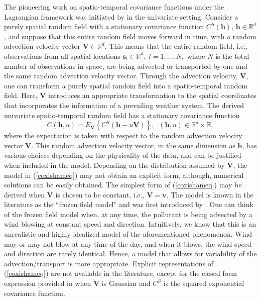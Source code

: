 \documentclass[12pt]{article}
\newcommand{\0}{\mathbf{0}}
\begin{document}
The pioneering work on spatio-temporal covariance functions under the Lagrangian framework was initiated by \citet{cox1988} in the univariate setting. Consider a purely spatial random field with a stationary covariance function $C^S(\mathbf{h})$, $\mathbf{h} \in \mathbb{R}^d$, and suppose that this entire random field moves forward in time, with a random advection velocity vector $\mathbf{V} \in \mathbb{R}^d$. This means that the entire random field, i.e., observations from all spatial locations $\mathbf{s}_l\in \mathbb{R}^d,\; l=1,\ldots,N,$ where $N$ is the total number of observations in space, are being advected or transported by one and the same random advection velocity vector. Through the advection velocity, $\mathbf{V}$, one can transform a purely spatial random field into a spatio-temporal random field. Here, $\mathbf{V}$ introduces an appropriate transformation to the spatial coordinates that incorporates the information of a prevailing weather system. The derived univariate spatio-temporal random field has a stationary covariance function
\begin{equation}\label{coxishameq}
C(\mathbf{h},u)=E_{\mathbf{V}}\left\{C^S(\mathbf{h}-u\mathbf{V})\right\},\;\;(\mathbf{h},u)\in\mathbb{R}^d\times \mathbb{R},
\end{equation}
where the expectation is taken with respect to the random advection velocity vector $\mathbf{V}$. This random advection velocity vector, in the same dimension as $\mathbf{h}$, has various choices depending on the physicality of the data, and can be justified when included in the model. Depending on the distribution assumed by $\mathbf{V}$, the model in (\ref{coxishameq}) may not obtain an explicit form, although, numerical solutions can be easily obtained. The simplest form of (\ref{coxishameq}) may be derived when $\mathbf{V}$ is chosen to be constant, i.e., $\mathbf{V}=\mathbf{v}$. The model is known in the literature as the ``frozen field model" and was first introduced by \citet{gupta1987taylor}. One can think of the frozen field model when, at any time, the pollutant is being advected by a wind blowing at constant speed and direction. Intuitively, we know that this is an unrealistic and highly idealized model of the aforementioned phenomenon. Wind may or may not blow at any time of the day, and when it blows, the wind speed and direction are rarely identical. Hence, a model that allows for variability of the advection/transport is more appropriate.  Explicit representations of (\ref{coxishameq}) are not available in the literature, except for the closed form expression provided in \citet{schlather2010some} when $\mathbf{V}$ is Gaussian and $C^S$ is the squared exponential covariance function.
\end{document}
